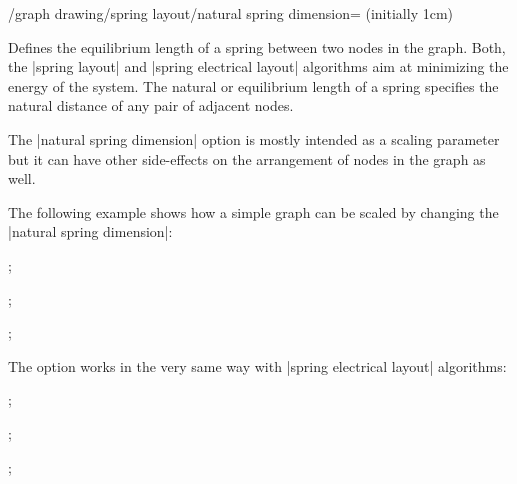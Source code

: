 \begin{key}{/graph drawing/spring layout/natural spring
  dimension= (initially 1cm)}

  Defines the equilibrium length of a spring between two nodes in the
  graph. Both, the |spring layout| and |spring electrical layout|
  algorithms aim at minimizing the energy of the system. The
  natural or equilibrium length of a spring specifies the natural
  distance of any pair of adjacent nodes.

  The |natural spring dimension| option is mostly intended as a scaling
  parameter but it can have other side-effects on the arrangement of
  nodes in the graph as well.

  The following example shows how a simple graph can be scaled by
  changing the |natural spring dimension|:
  \begin{codeexample}[width=5cm]
\tikz {};

\tikz {};

\tikz {};
  \end{codeexample}

  The option works in the very same way with |spring electrical layout|
  algorithms:
  \begin{codeexample}[width=5cm]
\tikz {};

\tikz {};

\tikz {};
  \end{codeexample}
\end{key}



